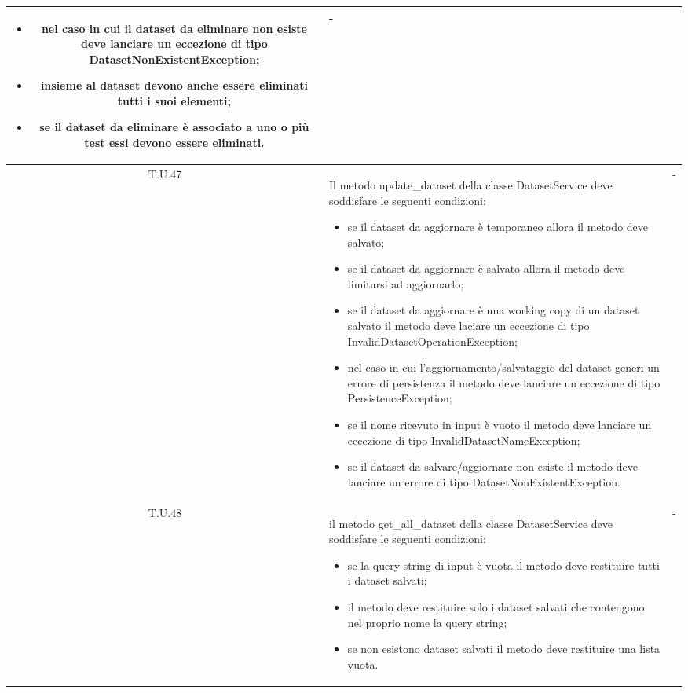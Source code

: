 \begin{tabularx}{\textwidth}{|c|X|c|}
    \begin{itemize}
        \item nel caso in cui il dataset da eliminare non esiste deve lanciare un eccezione di tipo DatasetNonExistentException;
        \item insieme al dataset devono anche essere eliminati tutti i suoi elementi;
        \item se il dataset da eliminare è associato a uno o più test essi devono essere eliminati.
    \end{itemize} & - \\
    \hline 
    \label{tu:tu47} T.U.47 & Il metodo update\_dataset della classe DatasetService deve soddisfare le seguenti condizioni:   
    \begin{itemize}
        \item se il dataset da aggiornare è temporaneo allora il metodo deve salvato;
        \item se il dataset da aggiornare è salvato allora il metodo deve limitarsi ad aggiornarlo;
        \item se il dataset da aggiornare è una working copy di un dataset salvato il metodo deve laciare un eccezione di tipo InvalidDatasetOperationException;
        \item nel caso in cui l'aggiornamento/salvataggio del dataset generi un errore di persistenza il metodo deve lanciare un eccezione di tipo PersistenceException; 
        \item se il nome ricevuto in input è vuoto il metodo deve lanciare un eccezione di tipo InvalidDatasetNameException;
        \item se il dataset da salvare/aggiornare non esiste il metodo deve lanciare un errore di tipo DatasetNonExistentException.
    \end{itemize} & - \\
    \hline 
    \label{tu:tu48} T.U.48 & il metodo get\_all\_dataset della classe DatasetService deve soddisfare le seguenti condizioni:
    \begin{itemize}
        \item se la query string di input è vuota il metodo deve restituire tutti i dataset salvati;
        \item il metodo deve restituire solo i dataset salvati che contengono nel proprio nome la query string;
        \item se non esistono dataset salvati il metodo deve restituire una lista vuota.
    \end{itemize} & - \\

\end{tabularx}

